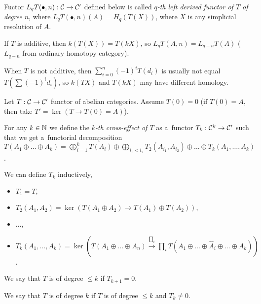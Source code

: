     \begin{definition}
        Fuctor $L_qT(\bullet, n): \mathcal{C} \to \mathcal{C}'$
        defined below is called 
        {\em $q$-th left derived functor of $T$ of degree $n$},
        where $L_qT(\bullet,n)(A) = H_q(T(X))$,
        where $X$ is any simplicial resolution of $A$.
    \end{definition}
    
    \begin{remark}
        If $T$ is additive, then $k(T(X)) = T(kX)$,
        so $L_qT(A,n) = L_{q-n}T(A)$
        ($L_{q-n}$ from ordinary homotopy category).
    \end{remark}
    
    \begin{remark}
        When $T$ is not additive, then 
        $\sum_{i=0}^n (-1)^i T(d_i)$ is usually not equal
        $T(\sum (-1)^i d_i)$,
        so $k(TX)$ and $T(kX)$ may have different homology.
    \end{remark}
    
    Let $T:\mathcal{C} \to \mathcal{C}'$ functor of abelian categories.
    Assume $T(0) = 0$ (if $T(0)= A$, then take $T' = \ker(T \to T(0) = A)$).
    
    \begin{definition}
        For any ${k \in {\mathbb{N}}}$ we define the 
        {\em $k$-th cross-effect of $T$}
        as a~functor $T_k:\mathcal{C}^k \to \mathcal{C}'$
        such that we get a~functorial decomposition
        $T(A_1 \oplus \ldots \oplus A_k)
        = \bigoplus_{i=1}^k T(A_i)
        \oplus \bigoplus_{i_1<i_2} T_2(A_{i_1}, A_{i_2})
        \oplus \ldots \oplus T_k(A_1, \ldots, A_k)$.
        
        We can define $T_k$ inductively,
        \begin{itemize}
            \item $T_1 = T$,
            \item $T_2(A_1,A_2) = 
            \ker(T(A_1 \oplus A_2) \to T(A_1) \oplus T(A_2))$,
            \item $\ldots$,
            \item $T_k(A_1, \ldots, A_k)
            = \ker(T(A_1 \oplus \ldots \oplus A_n) \xrightarrow{\prod_i}
            \prod_i T(A_1 \oplus \ldots \oplus \hat{A}_i \oplus \ldots \oplus A_k))$.
        \end{itemize}
    \end{definition}
    
    \begin{definition}
        We say that $T$ is of degree $\leq k$ if $T_{k+1} = 0$.
        
        We say that $T$ is of degree $k$ 
        if $T$ is of degree $\leq k$ and $T_k \neq 0$.
    \end{definition}
    
